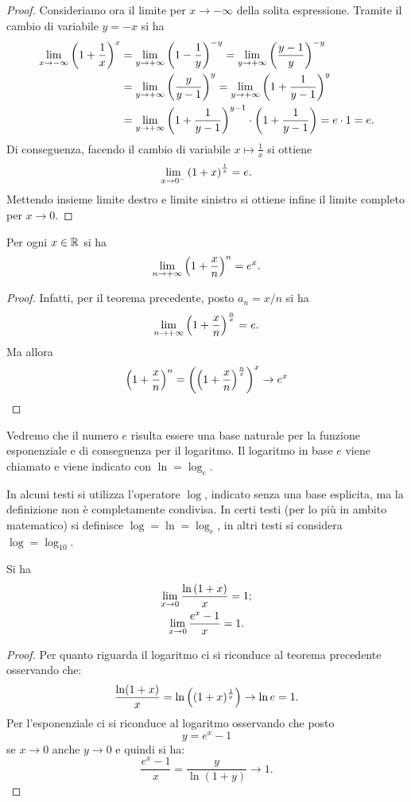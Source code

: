 \begin{proof}
  Consideriamo ora il limite per $x\to -\infty$ 
  della solita espressione. 
  Tramite il cambio di variabile $y=-x$ si ha 
  \begin{align*}
  \lim_{x\to -\infty} {\left( 1+\frac{1}{x} \right)}^x 
  &= \lim_{y\to +\infty} {\left( 1 - \frac 1 y \right)}^{-y}
   = \lim_{y\to +\infty} {\left( \frac {y-1} y \right)}^{-y}\\
  &= \lim_{y\to +\infty} {\left( \frac{y}{y-1} \right)}^y
   = \lim_{y\to +\infty} {\left( 1 + \frac{1}{y-1} \right)}^y\\
  &= \lim_{y\to +\infty} {\left( 1 + \frac{1}{y-1} \right)}^{y-1}
    \cdot{\left( 1+\frac 1 {y-1} \right)} 
    = e\cdot 1 = e.\\
  \end{align*}
  Di conseguenza, facendo il cambio di variabile $x\mapsto \frac 1 x$ 
  si ottiene
  \[
  \lim_{x\to 0^-} {\left( 1+x \right)}^{\frac 1 x} = e.
  \]
  Mettendo insieme limite destro e limite sinistro si ottiene 
  infine il limite completo per $x\to 0$. 
\end{proof}
%
\begin{corollary}%
\label{cor:limite_notevole_ex}%
\mymark{**}%
Per ogni $x\in \mathbb R$ si ha
\[
  \lim_{n\to +\infty} {\left( 1+ \frac x n \right)}^n = e^x.
\]
\end{corollary}
%
\begin{proof}
Infatti, per il teorema precedente, posto $a_n = x/n$ si ha
\[
\lim_{n\to +\infty}{\left( 1+\frac x n \right)}^{\frac n x} = e.
\]
Ma allora
\[
{\left( 1+ \frac x n \right)}^n = {\left( {\left( 1+\frac x n \right)}^{\frac n x} \right)}^x
\to e^x
\]
\end{proof}

\begin{definition}
Vedremo che il numero $e$ risulta essere una base naturale per la funzione
esponenziale e di conseguenza per il logaritmo. Il logaritmo in base
$e$ viene chiamato  e viene indicato con $\ln = \log_e$.
\end{definition}

In alcuni testi si utilizza l'operatore $\log$, indicato senza una base esplicita,
ma la definizione non è completamente condivisa.
In certi testi (per lo più in ambito matematico)
si definisce $\log  = \ln = \log_e$,
in altri testi si considera $\log = \log_{10}$.

\begin{corollary}\label{cor:limite_notevole_e}
\mymark{*}%
Si ha
\begin{gather}
 \lim_{x\to 0} \frac{\ln {\left( 1+ x \right)}}{x} = 1; \\
 \lim_{x\to 0} \frac{e^x-1}{x} = 1.
\end{gather}
\end{corollary}
%
\begin{proof}
Per quanto riguarda il logaritmo ci si riconduce al teorema precedente
osservando che:
\[
  \frac{\ln(1+x)}{x}
  = \ln {\left( (1+x)^{\frac 1 {x}} \right)}
  \to \ln e = 1.
\]
Per l'esponenziale ci si riconduce al logaritmo
osservando che posto
\[
  y = e^x-1
\]
se $x\to 0$ anche $y\to 0$ e quindi si ha:
\[
\frac{e^{x}-1}{x} = \frac{y}{\ln(1+y)} \to 1.
\]

\end{proof}

